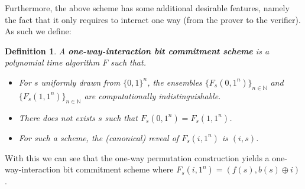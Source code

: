 \documentclass{article}
\newtheorem{definition}{Definition}
\begin{document}
Furthermore, the above scheme has some additional desirable features, namely the fact that it only requires to interact one way (from the prover to the verifier).
As such we define:
\begin{definition}
    A \textbf{one-way-interaction bit commitment scheme} is a polynomial time algorithm $F$ such that.
    \begin{itemize}
        \item For $s$ uniformly drawn from $\{0, 1\}^n$, the ensembles $\{ F_s(0, 1^n) \}_{n \in \mathbb{N}}$ and $\{ F_s(1, 1^n) \}_{n \in \mathbb{N}}$ are computationally indistinguishable.
        \item There does not exists $s$ such that $F_s(0, 1^n) = F_s(1, 1^n)$.
        \item For such a scheme, the (canonical) reveal of $F_s(i, 1^n)$ is $(i, s)$.
    \end{itemize}
\end{definition}
With this we can see that the one-way permutation construction yields a one-way-interaction bit commitment scheme where $F_s(i, 1^n) = (f(s), b(s) \oplus i)$.
\end{document}
